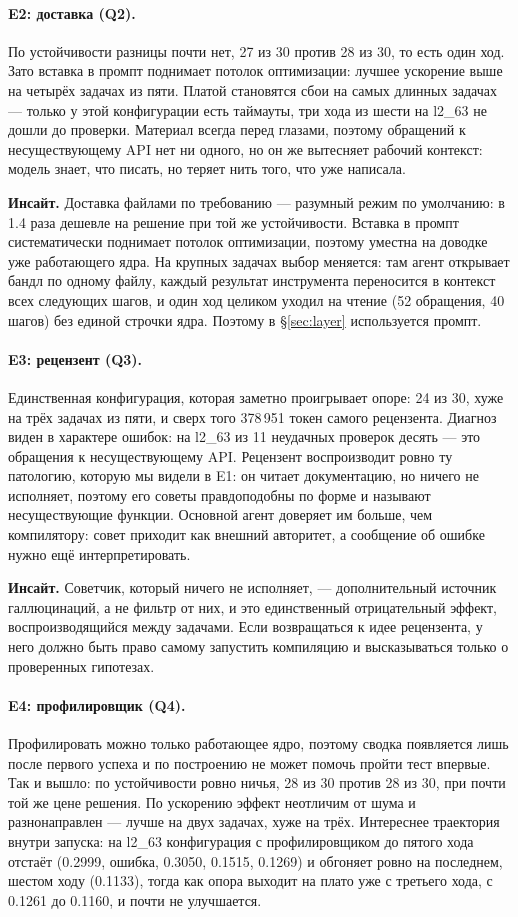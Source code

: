 \documentclass[10pt,a4paper]{article}
\newcommand{\insight}[1]{\par\smallskip\noindent\textbf{Инсайт.} #1\par\smallskip}
\begin{document}
\paragraph{E2: доставка (Q2).} По устойчивости разницы почти нет, 27 из 30 против 28 из 30,
то есть один ход. Зато вставка в промпт поднимает потолок оптимизации: лучшее ускорение выше
на четырёх задачах из пяти. Платой становятся сбои на самых длинных задачах --- только у этой
конфигурации есть таймауты, три хода из шести на l2\_63 не дошли до проверки. Материал всегда
перед глазами, поэтому обращений к несуществующему API нет ни одного, но он же вытесняет
рабочий контекст: модель знает, что писать, но теряет нить того, что уже написала.

\insight{Доставка файлами по требованию --- разумный режим по умолчанию: в 1.4 раза дешевле
на решение при той же устойчивости. Вставка в промпт систематически поднимает потолок
оптимизации, поэтому уместна на доводке уже работающего ядра. На крупных задачах выбор
меняется: там агент открывает бандл по одному файлу, каждый результат инструмента переносится
в контекст всех следующих шагов, и один ход целиком уходил на чтение (52 обращения, 40 шагов)
без единой строчки ядра. Поэтому в §\ref{sec:layer} используется промпт.}

\paragraph{E3: рецензент (Q3).} Единственная конфигурация, которая заметно проигрывает
опоре: 24 из 30, хуже на трёх задачах из пяти, и сверх того 378\,951 токен самого рецензента.
Диагноз виден в характере ошибок: на l2\_63 из 11 неудачных проверок десять --- это
обращения к несуществующему API. Рецензент воспроизводит ровно ту патологию, которую мы
видели в E1: он читает документацию, но ничего не исполняет, поэтому его советы правдоподобны
по форме и называют несуществующие функции. Основной агент доверяет им больше, чем
компилятору: совет приходит как внешний авторитет, а сообщение об ошибке нужно ещё
интерпретировать.

\insight{Советчик, который ничего не исполняет, --- дополнительный источник галлюцинаций, а
не фильтр от них, и это единственный отрицательный эффект, воспроизводящийся между задачами.
Если возвращаться к идее рецензента, у него должно быть право самому запустить компиляцию и
высказываться только о проверенных гипотезах.}

\paragraph{E4: профилировщик (Q4).} Профилировать можно только работающее ядро, поэтому
сводка появляется лишь после первого успеха и по построению не может помочь пройти тест
впервые. Так и вышло: по устойчивости ровно ничья, 28 из 30 против 28 из 30, при почти той
же цене решения. По ускорению эффект неотличим от шума и разнонаправлен --- лучше на двух
задачах, хуже на трёх. Интереснее траектория внутри запуска: на l2\_63 конфигурация с
профилировщиком до пятого хода отстаёт (0.2999, ошибка, 0.3050, 0.1515, 0.1269) и обгоняет
ровно на последнем, шестом ходу (0.1133), тогда как опора выходит на плато уже с третьего
хода, с 0.1261 до 0.1160, и почти не улучшается.
\end{document}
